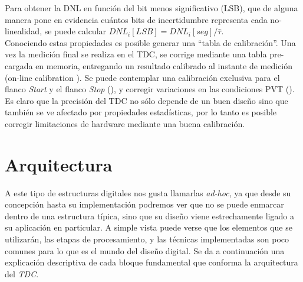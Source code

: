 Para obtener la DNL en función del bit menos significativo (LSB), que de alguna manera
pone en evidencia cuántos bits de incertidumbre representa cada no-linealidad, 
se puede calcular $DNL_i[LSB] = DNL_i[seg] / \hat{\tau}$.\\
Conociendo estas propiedades es posible generar una ``tabla de calibración''. Una vez la medición final
se realiza en el TDC, se corrige mediante una tabla pre-cargada en memoria, entregando un resultado
calibrado al instante de medición (on-line calibration \cite{Liu2015}). Se puede contemplar
una calibración exclusiva para el flanco \textit{Start} y el flanco \textit{Stop} (\cite{Khaddour2023}), y 
corregir variaciones en las condiciones PVT (\cite{Qin2017}).
Es claro que la precisión del TDC no sólo depende de un buen diseño sino que también 
se ve afectado por propiedades estadísticas, por lo tanto es posible corregir limitaciones de
hardware mediante una buena calibración.\\






\section{Arquitectura}

A este tipo de estructuras digitales nos gusta llamarlas \textit{ad-hoc}, ya que desde su concepción hasta su
implementación podremos ver que no se puede enmarcar dentro de una estructura típica, sino que su diseño viene estrechamente ligado
a su aplicación en particular. A simple vista puede verse que los elementos que se utilizarán, las etapas de procesamiento,
y las técnicas implementadas son poco comunes para lo que es el mundo del diseño digital. Se da a continuación 
una explicación descriptiva de cada bloque fundamental que conforma la arquitectura del \textit{TDC}.

